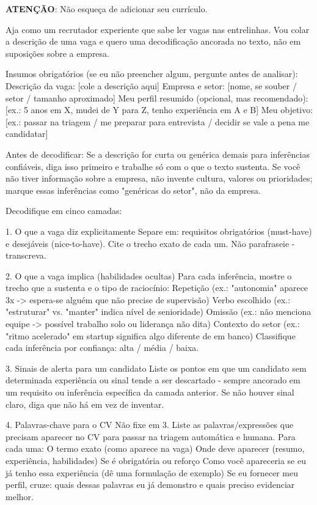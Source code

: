 \documentclass[11pt, a4paper]{article}
\begin{document}
\textbf{ATENÇÃO}: Não esqueça de adicionar seu currículo.

\begin{promptbox}
Aja como um recrutador experiente que sabe ler vagas nas entrelinhas. Vou colar a descrição de uma vaga e quero uma decodificação ancorada no texto, não em suposições sobre a empresa.
	
Insumos obrigatórios (se eu não preencher algum, pergunte antes de analisar):
 Descrição da vaga: [cole a descrição aqui]
 Empresa e setor: [nome, se souber / setor / tamanho aproximado]
 Meu perfil resumido (opcional, mas recomendado): [ex.: 5 anos em X, mudei de Y para Z, tenho experiência em A e B]
 Meu objetivo: [ex.: passar na triagem / me preparar para entrevista / decidir se vale a pena me candidatar]
	
Antes de decodificar:
 Se a descrição for curta ou genérica demais para inferências confiáveis, diga isso primeiro e trabalhe só com o que o texto sustenta.
 Se você não tiver informação sobre a empresa, não invente cultura, valores ou prioridades; marque essas inferências como "genéricas do setor", não da empresa.
	
Decodifique em cinco camadas:

1. O que a vaga diz explicitamente
 Separe em: requisitos obrigatórios (must-have) e desejáveis (nice-to-have). Cite o trecho exato de cada um. Não parafraseie - transcreva.
	
2. O que a vaga implica (habilidades ocultas)
 Para cada inferência, mostre o trecho que a sustenta e o tipo de raciocínio:
  Repetição (ex.: "autonomia" aparece 3x -> espera-se alguém que não precise de supervisão)
  Verbo escolhido (ex.: "estruturar" vs. "manter" indica nível de senioridade)
  Omissão (ex.: não menciona equipe -> possível trabalho solo ou liderança não dita)
  Contexto do setor (ex.: "ritmo acelerado" em startup significa algo diferente de em banco)
  Classifique cada inferência por confiança: alta / média / baixa.
	
3. Sinais de alerta para um candidato
 Liste os pontos em que um candidato sem determinada experiência ou sinal tende a ser descartado - sempre ancorado em um requisito ou inferência específica da camada anterior. Se não houver sinal claro, diga que não há em vez de inventar.
	
4. Palavras-chave para o CV
 Não fixe em 3. Liste as palavras/expressões que precisam aparecer no CV para passar na triagem automática e humana. Para cada uma:
  O termo exato (como aparece na vaga)
  Onde deve aparecer (resumo, experiência, habilidades)
  Se é obrigatória ou reforço
  Como você apareceria se eu já tenho essa experiência (dê uma formulação de exemplo)
  Se eu fornecer meu perfil, cruze: quais dessas palavras eu já demonstro e quais preciso evidenciar melhor.
	

\end{promptbox}
\end{document}
